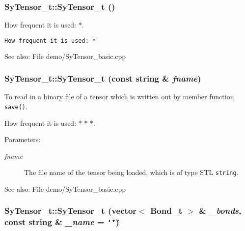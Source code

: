 \subsubsection{\setlength{\rightskip}{0pt plus 5cm}Sy\-Tensor\_\-t::Sy\-Tensor\_\-t ()}\label{d1/d9f/classSyTensor__t_89c494977034fcf3f754881fcbea7f7f}


How frequent it is used: $\ast$. 



\footnotesize\begin{verbatim}How frequent it is used: * \end{verbatim}
\normalsize
 \begin{Desc}
\item[See also:]File demo/Sy\-Tensor\_\-basic.cpp \end{Desc}
\subsubsection{\setlength{\rightskip}{0pt plus 5cm}Sy\-Tensor\_\-t::Sy\-Tensor\_\-t (const string \& {\em fname})}\label{d1/d9f/classSyTensor__t_f71929efcd5c48f2085e38186848c48f}


To read in a binary file of a tensor which is written out by member function {\tt save()}.\par
 How frequent it is used: $\ast$ $\ast$ $\ast$. 

\begin{Desc}
\item[Parameters:]
\begin{description}
\item[{\em fname}]The file name of the tensor being loaded, which is of type STL {\tt string}. \end{description}
\end{Desc}
\begin{Desc}
\item[See also:]File demo/Sy\-Tensor\_\-basic.cpp \end{Desc}
\subsubsection{\setlength{\rightskip}{0pt plus 5cm}Sy\-Tensor\_\-t::Sy\-Tensor\_\-t (vector$<$ Bond\_\-t $>$ \& {\em \_\-bonds}, const string \& {\em \_\-name} = {\tt \char`\"{}\char`\"{}})}\label{d1/d9f/classSyTensor__t_52eebed5a6f64e52e2ed2eb3499415b0}


